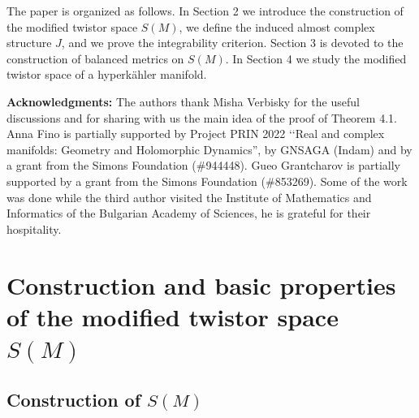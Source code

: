 \documentclass[11pt]{amsart}
\theoremstyle{definition}
\theoremstyle{plain}
\theoremstyle{definition}
\theoremstyle{plain}
\theoremstyle{remark}
\theoremstyle{plain}
\begin{document}
The paper is organized as follows. In Section 2  we introduce the construction of the modified twistor space $S(M)$,  we define the induced almost complex structure $J$, and we prove the integrability criterion. 
Section 3 is devoted to the construction of balanced metrics on $S(M)$.  In Section 4 we study the modified twistor space of a hyperk\"ahler manifold.

\smallskip



\textbf{Acknowledgments:}  The authors thank Misha Verbisky for the useful discussions and for sharing with us the main idea of the proof of Theorem 4.1. Anna Fino  is  partially supported by Project PRIN 2022 \lq \lq Real and complex manifolds:
Geometry and Holomorphic Dynamics”, by GNSAGA (Indam) and by   a grant from the
Simons Foundation (\#944448).  Gueo Grantcharov is partially supported by a grant from
the Simons Foundation (\#853269).  Some of the work was done while the third author visited the  Institute of Mathematics and Informatics of the Bulgarian Academy of Sciences,  he is grateful for their hospitality.


\section{Construction and basic properties of the modified twistor space $S(M)$}

\subsection{Construction of $S(M)$} 
\end{document}

